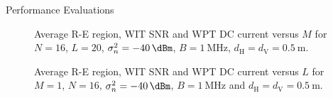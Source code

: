 \documentclass[journal]{IEEEtran}
\begin{document}
\begin{section}{Performance Evaluations}
		\begin{figure}[!t]
			\centering
			\caption{Average R-E region, WIT SNR and WPT DC current versus $M$ for $N=16$, $L=20$, $\sigma_n^2=\SI{-40}{\dBm}$, $B=\SI{1}{\MHz}$, $d_{\mathrm{H}}=d_{\mathrm{V}}=\SI{0.5}{\meter}$.}
		\end{figure}

		\begin{figure}[!t]
			\centering
			\caption{Average R-E region, WIT SNR and WPT DC current versus $L$ for $M=1$, $N=16$, $\sigma_n^2=\SI{-40}{\dBm}$, $B=\SI{1}{\MHz}$ and $d_{\mathrm{H}}=d_{\mathrm{V}}=\SI{0.5}{\meter}$.}
		\end{figure}


\end{section}
\end{document}
